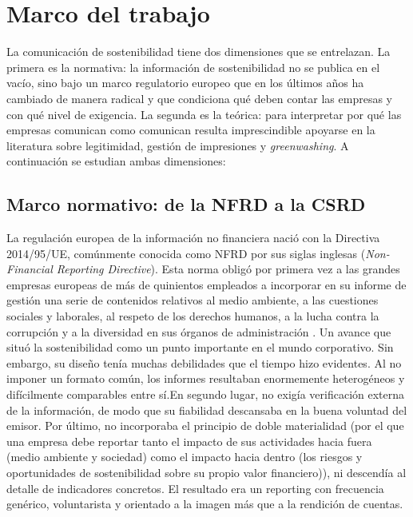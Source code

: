 \chapter{Marco del trabajo}
\label{cap:marco}

La comunicación de sostenibilidad tiene
dos dimensiones que se entrelazan. La primera es la normativa: la información de sostenibilidad
no se publica en el vacío, sino bajo un marco regulatorio europeo que en los últimos años ha
cambiado de manera radical y que condiciona qué deben contar las empresas y con qué nivel de
exigencia. La segunda es la teórica: para interpretar por qué las empresas comunican como
comunican resulta imprescindible apoyarse en la literatura sobre legitimidad, gestión de impresiones 
y \textit{greenwashing}. A continuación se estudian ambas dimensiones:

\section{Marco normativo: de la NFRD a la CSRD}
\label{sec:normativa}

La regulación europea de la información no financiera nació con la
Directiva 2014/95/UE, comúnmente conocida como NFRD por sus siglas inglesas
(\textit{Non-Financial Reporting Directive}). Esta norma obligó por primera vez a las grandes
empresas europeas de más de quinientos empleados a incorporar en su informe de gestión una
serie de contenidos relativos al medio ambiente, a las cuestiones sociales y laborales, al
respeto de los derechos humanos, a la lucha contra la corrupción y a la diversidad en sus
órganos de administración \parencite{nfrd2014}. Un avance que situó la
sostenibilidad como un punto importante en el mundo corporativo. Sin embargo, su diseño
tenía muchas debilidades que el tiempo hizo evidentes. Al no imponer un formato común, los
informes resultaban enormemente heterogéneos y difícilmente comparables entre sí.En segundo lugar, no exigía
verificación externa de la información, de modo que su fiabilidad descansaba en la buena
voluntad del emisor. Por último, no incorporaba el principio de doble materialidad (por el que una empresa 
debe reportar tanto el impacto de sus actividades hacia fuera (medio ambiente y sociedad) 
como el impacto hacia dentro (los riesgos y oportunidades de sostenibilidad sobre su propio valor financiero)), ni
descendía al detalle de indicadores concretos. El resultado era un reporting con frecuencia
genérico, voluntarista y orientado a la imagen más que a la rendición de cuentas.

